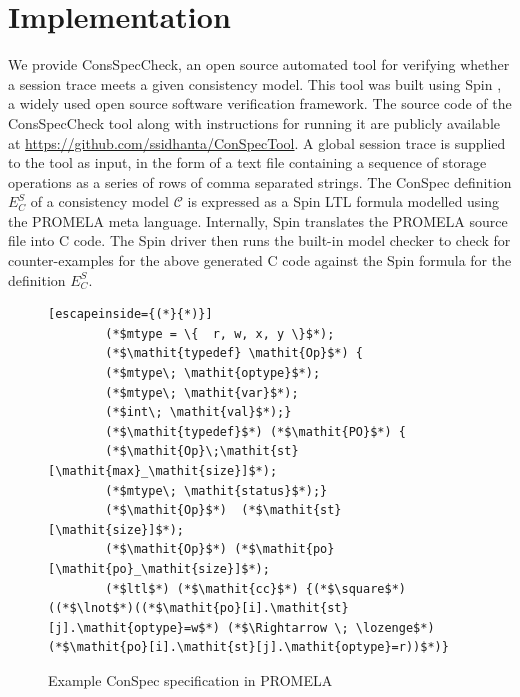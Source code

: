 \documentclass[journal, compsoc]{IEEEtran}
\begin{document}
	\section{Implementation}\label{sec:impl}
	We provide ConsSpecCheck, an open source automated  tool for verifying whether a session trace meets a given consistency model. This tool was built using Spin \cite{Holzmann:2003:SMC:1405716}, a widely used open source software verification framework. The source code of the ConsSpecCheck tool  along with instructions for running it are publicly available at \url{https://github.com/ssidhanta/ConSpecTool}.  %
	A global session trace is supplied to the tool as input, in the form of a text file containing a sequence of storage operations as a series of rows of comma separated strings.  The ConSpec definition $E^S_C$ of a consistency model $\mathcal{C}$ is expressed as a Spin LTL formula modelled using the PROMELA meta language. 
	Internally, Spin translates the PROMELA source file into C code. The Spin driver then runs the built-in model checker to check for counter-examples for the above generated C code  against  the Spin formula for  the definition $E^S_C$. %
	\begin{figure}
		\begin{lstlisting}[escapeinside={(*}{*)}]
		(*$mtype = \{  r, w, x, y \}$*);
		(*$\mathit{typedef} \mathit{Op}$*) {
		(*$mtype\; \mathit{optype}$*);
		(*$mtype\; \mathit{var}$*);
		(*$int\; \mathit{val}$*);}
		(*$\mathit{typedef}$*) (*$\mathit{PO}$*) {
		(*$\mathit{Op}\;\mathit{st}[\mathit{max}_\mathit{size}]$*);
		(*$mtype\; \mathit{status}$*);}
		(*$\mathit{Op}$*)  (*$\mathit{st}[\mathit{size}]$*);
		(*$\mathit{Op}$*) (*$\mathit{po}[\mathit{po}_\mathit{size}]$*);
		(*$ltl$*) (*$\mathit{cc}$*) {(*$\square$*)((*$\lnot$*)((*$\mathit{po}[i].\mathit{st}[j].\mathit{optype}=w$*) (*$\Rightarrow \; \lozenge$*)(*$\mathit{po}[i].\mathit{st}[j].\mathit{optype}=r))$*)}
		\end{lstlisting}
		\caption{Example ConSpec specification in PROMELA}\label{format:spec}
	\end{figure}
\end{document}
